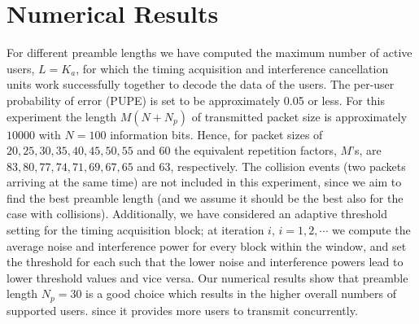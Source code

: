 \documentclass[journal,onecolumn,12pt]{IEEEtran}
\begin{document}
\section{Numerical Results}\label{sec:numericalResults}
For different preamble lengths we have computed the maximum number of active users, $L=K_a$, for which the timing acquisition and interference cancellation units work successfully together to decode the data of the users. The per-user probability of error (PUPE) is set to be approximately 0.05 or less. For this experiment the length $M(N+N_p)$ of transmitted packet size is approximately $10000$ with $N=100$ information bits. Hence, for packet sizes of $20, 25, 30, 35, 40, 45, 50 ,55$ and $60$ the equivalent repetition factors, $M$'s, are $83, 80, 77, 74, 71, 69,67, 65$ and $63$, respectively. The collision events (two packets arriving at the same time) are not included in this experiment, since we aim to find the best preamble length (and we assume it should be the best also for the case with collisions). Additionally, we have considered an adaptive threshold setting for the timing acquisition block; at iteration $i$, $i=1,2,\cdots$ we compute the average noise and interference power for every block within the window, and set the threshold for each such that the lower noise and interference powers lead to lower threshold values and vice versa. Our numerical results show that preamble length $N_p=30$ is a good choice which results in the higher overall numbers of supported users.  since it provides more users to transmit concurrently. 
\end{document}
